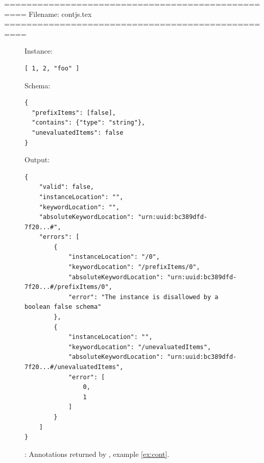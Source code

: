 ==================================================
Filename: contjs.tex
==================================================

\begin{figure}
\small

Instance:
\begin{querybox}{}
\begin{lstlisting}[style=querynonumbers]
[ 1, 2, "foo" ]
\end{lstlisting}
\end{querybox}
Schema:
\begin{querybox}{}
\begin{lstlisting}[style=query]
{
  "prefixItems": [false],
  "contains": {"type": "string"},
  "unevaluatedItems": false
}
\end{lstlisting}
\end{querybox}

Output:
\begin{querybox}{}
\begin{lstlisting}[style=query]
{
    "valid": false,
    "instanceLocation": "",
    "keywordLocation": "",
    "absoluteKeywordLocation": "urn:uuid:bc389dfd-7f20...#",
    "errors": [
        {
            "instanceLocation": "/0",
            "keywordLocation": "/prefixItems/0",
            "absoluteKeywordLocation": "urn:uuid:bc389dfd-7f20...#/prefixItems/0",
            "error": "The instance is disallowed by a boolean false schema"
        },
        {
            "instanceLocation": "",
            "keywordLocation": "/unevaluatedItems",
            "absoluteKeywordLocation": "urn:uuid:bc389dfd-7f20...#/unevaluatedItems",
            "error": [
                0,
                1
            ]
        }
    ]
}
\end{lstlisting}
\end{querybox}

\caption{{\qcont}: Annotations returned by {\JSD}, example \ref{ex:cont}.}
\label{fig:contjs}
\end{figure}



